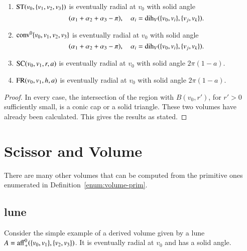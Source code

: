\begin{lemma} 
\begin{enumerate}
    \item  ${\operatorname{ST}}(v_0,\{v_1,v_2,v_3\})$ is eventually radial at $v_0$
     with solid angle 
     $$
     (\alpha_1+\alpha_2+\alpha_3-\pi),\quad
     \alpha_i=\operatorname{dih}_V(\{v_0,v_i\},\{v_j,v_k\}).
     $$
    \item ${\operatorname{conv}}^0\{v_0,v_1,v_2,v_3\}$ is eventually radial at $v_0$
      with solid angle
           $$
     (\alpha_1+\alpha_2+\alpha_3-\pi),\quad
     \alpha_i=\operatorname{dih}_V(\{v_0,v_i\},\{v_j,v_k\}).
     $$
    \item ${\operatorname{SC}}(v_0,v_1,r,a)$ is eventually radial at $v_0$ with solid
      angle 
      $2\pi(1-a)$.
    \item ${\operatorname{FR}}(v_0,v_1,h,a)$ is eventually radial at $v_0$ with solid
      angle        $2\pi (1-a)$.
%
\end{enumerate}
\end{lemma}
%

%
%
%
%

\begin{proof} In every case, the intersection of 
  the region with $B(v_0,r')$, for $r'>0$ sufficiently small, is
  a conic cap or a solid triangle.  These two volumes have
  already been calculated.  This gives the results as stated.
\end{proof}


\section{Scissor and Volume}

There are many other volumes that can be computed from the
primitive ones enumerated in Definition~\ref{enum:volume-prim}.

\subsection{lune}  
%

Consider the simple example of a derived volume given by a
lune $A={\operatorname{aff}}_+^0(\{v_0,v_1\},\{v_2,v_3\})$.  It is eventually
radial at $v_0$ and has a solid angle.
%

